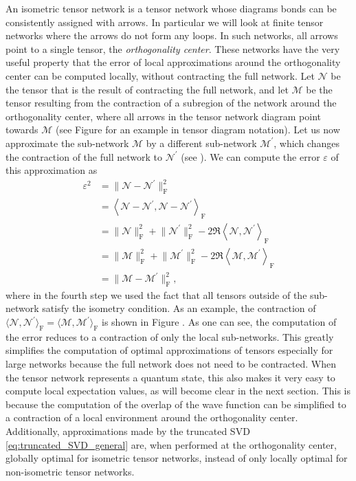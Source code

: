 An isometric tensor network is a tensor network whose diagrams bonds can be consistently assigned with arrows. In particular we will look at finite tensor networks where the arrows do not form any loops. In such networks, all arrows point to a single tensor, the \textit{orthogonality center}. These networks have the very useful property that the error of local approximations around the orthogonality center can be computed locally, without contracting the full network. Let $\mathcal{N}$ be the tensor that is the result of contracting the full network, and let $\mathcal{M}$ be the tensor resulting from the contraction of a subregion of the network around the orthogonality center, where all arrows in the tensor network diagram point towards $\mathcal{M}$ (see Figure  for an example in tensor diagram notation). Let us now approximate the sub-network $\mathcal{M}$ by a different sub-network $\mathcal{M}^\prime$, which changes the contraction of the full network to $\mathcal{N}^\prime$ (see ). We can compute the error $\varepsilon$ of this approximation as
\begin{equation}
\begin{split}
	\varepsilon^2 &= \lVert\mathcal{N}-\mathcal{N}^\prime\rVert^2_\text{F} \\
	&=
	\left\langle\mathcal{N}-\mathcal{N}^\prime, \mathcal{N}-\mathcal{N}^\prime\right\rangle_\text{F} \\
	&= \lVert\mathcal{N}\rVert_\text{F}^2 + \lVert\mathcal{N}^\prime\rVert_\text{F}^2 - 2\Re\left\langle\mathcal{N},\mathcal{N}^\prime\right\rangle_\text{F} \\
	&= \lVert\mathcal{M}\rVert_\text{F}^2 + \lVert\mathcal{M}^\prime\rVert_\text{F}^2 - 2\Re\left\langle\mathcal{M},\mathcal{M}^\prime\right\rangle_\text{F} \\
	&= \lVert\mathcal{M}-\mathcal{M}^\prime\rVert^2_\text{F},
\end{split}
\end{equation}
where in the fourth step we used the fact that all tensors outside of the sub-network satisfy the isometry condition. As an example, the contraction of $\langle\mathcal{N},\mathcal{N}^\prime\rangle_\text{F} = \langle\mathcal{M},\mathcal{M}^\prime\rangle_\text{F}$ is shown in Figure . As one can see, the computation of the error reduces to a contraction of only the local sub-networks. This greatly simplifies the computation of optimal approximations of tensors especially for large networks because the full network does not need to be contracted. When the tensor network represents a quantum state, this also makes it very easy to compute local expectation values, as will become clear in the next section. This is because the computation of the overlap of the wave function can be simplified to a contraction of a local environment around the orthogonality center. Additionally, approximations made by the truncated SVD \ref{eq:truncated_SVD_general} are, when performed at the orthogonality center, globally optimal for isometric tensor networks, instead of only locally optimal for non-isometric tensor networks.
